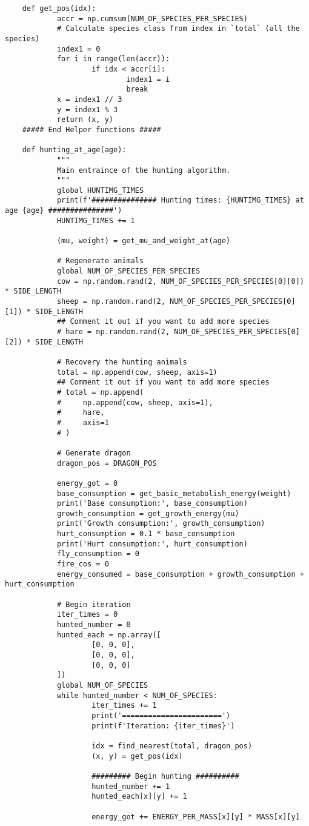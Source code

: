 \documentclass{article}
\begin{document}
\begin{lstlisting}
	def get_pos(idx):
			accr = np.cumsum(NUM_OF_SPECIES_PER_SPECIES)
			# Calculate species class from index in `total` (all the species)
			index1 = 0
			for i in range(len(accr)):
					if idx < accr[i]:
							index1 = i
							break
			x = index1 // 3
			y = index1 % 3
			return (x, y)
	##### End Helper functions #####
	
	def hunting_at_age(age):
			"""
			Main entraince of the hunting algorithm.
			"""
			global HUNTIMG_TIMES
			print(f'############### Hunting times: {HUNTIMG_TIMES} at age {age} ###############')
			HUNTIMG_TIMES += 1
	
			(mu, weight) = get_mu_and_weight_at(age)
	
			# Regenerate animals
			global NUM_OF_SPECIES_PER_SPECIES
			cow = np.random.rand(2, NUM_OF_SPECIES_PER_SPECIES[0][0]) * SIDE_LENGTH
			sheep = np.random.rand(2, NUM_OF_SPECIES_PER_SPECIES[0][1]) * SIDE_LENGTH
			## Comment it out if you want to add more species
			# hare = np.random.rand(2, NUM_OF_SPECIES_PER_SPECIES[0][2]) * SIDE_LENGTH
			
			# Recovery the hunting animals
			total = np.append(cow, sheep, axis=1)
			## Comment it out if you want to add more species
			# total = np.append(
			#     np.append(cow, sheep, axis=1),
			#     hare,
			#     axis=1
			# )
	
			# Generate dragon
			dragon_pos = DRAGON_POS
	
			energy_got = 0
			base_consumption = get_basic_metabolish_energy(weight)
			print('Base consumption:', base_consumption)
			growth_consumption = get_growth_energy(mu)
			print('Growth consumption:', growth_consumption)
			hurt_consumption = 0.1 * base_consumption
			print('Hurt consumption:', hurt_consumption)
			fly_consumption = 0
			fire_cos = 0
			energy_consumed = base_consumption + growth_consumption + hurt_consumption
			
			# Begin iteration
			iter_times = 0
			hunted_number = 0
			hunted_each = np.array([
					[0, 0, 0],
					[0, 0, 0],
					[0, 0, 0]
			])
			global NUM_OF_SPECIES
			while hunted_number < NUM_OF_SPECIES:
					iter_times += 1
					print('=======================')
					print(f'Iteration: {iter_times}')
	
					idx = find_nearest(total, dragon_pos)
					(x, y) = get_pos(idx)
	
					######### Begin hunting ##########
					hunted_number += 1
					hunted_each[x][y] += 1
	
					energy_got += ENERGY_PER_MASS[x][y] * MASS[x][y]
	

\end{lstlisting}
\end{document}
